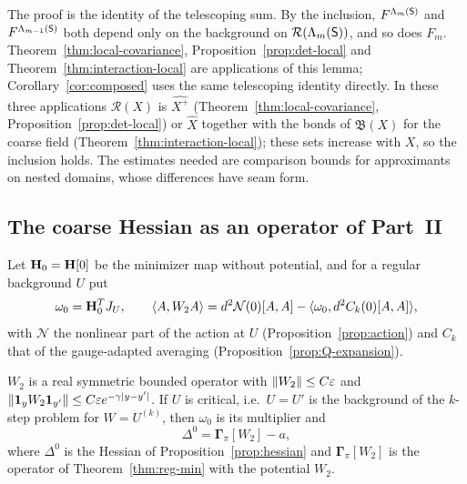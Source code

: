 The proof is the identity of the telescoping sum. By the inclusion, $F^{\Lambda_m(\mathsf S)}$ and $F^{\Lambda_{m-1}(\mathsf S)}$ both depend only on the background on $\mathcal R(\Lambda_m(\mathsf S))$, and so does $F_m$. Theorem~\ref{thm:local-covariance}, Proposition~\ref{prop:det-local} and Theorem~\ref{thm:interaction-local} are applications of this lemma; Corollary~\ref{cor:composed} uses the same telescoping identity directly. In these three applications $\mathcal R(X)$ is $\widehat{X^+}$ (Theorem~\ref{thm:local-covariance}, Proposition~\ref{prop:det-local}) or $\hat X$ together with the bonds of $\mathfrak B(X)$ for the coarse field (Theorem~\ref{thm:interaction-local}); these sets increase with $X$, so the inclusion holds. The estimates needed are comparison bounds for approximants on nested domains, whose differences have seam form.

\subsection{The coarse Hessian as an operator of Part~II}

Let $\mathbf H_0=\mathbf H[0]$ be the minimizer map without potential, and for a regular background $U$ put
\[
\omega_0=\mathbf H_0^TJ_U,\qquad\langle A,W_2A\rangle=d^2\mathcal N(0)[A,A]-\langle \omega_0,d^2C_k(0)[A,A]\rangle,
\]
with $\mathcal N$ the nonlinear part of the action at $U$ (Proposition~\ref{prop:action}) and $C_k$ that of the gauge-adapted averaging (Proposition~\ref{prop:Q-expansion}).

\begin{lemma}\label{lem:hessian-gamma}
$W_2$ is a real symmetric bounded operator with $\|W_2\|\le C\varepsilon$ and $\|\mathbf 1_yW_2\mathbf 1_{y'}\|\le C\varepsilon e^{-\gamma|y-y'|}$. If $U$ is critical, i.e.\ $U=U'$ is the background of the $k$-step problem for $W=U^{(k)}$, then $\omega_0$ is its multiplier and
\[
\Delta^0=\boldsymbol\Gamma_\pi[W_2]-a,
\]
where $\Delta^0$ is the Hessian of Proposition~\ref{prop:hessian} and $\boldsymbol\Gamma_\pi[W_2]$ is the operator of Theorem~\ref{thm:reg-min} with the potential $W_2$.
\end{lemma}

